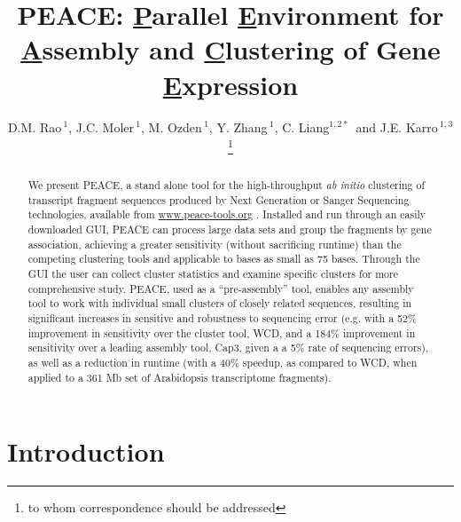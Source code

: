 \documentclass[a4,center,fleqn]{NAR}
\newcommand{\peace} {{\small PEACE}}
\newcommand{\wcd} {{\small WCD}}
\newcommand{\capthree} {{\small Cap3}}
\begin{document}
\title{PEACE: {\underline P}arallel {\underline E}nvironment for {\underline A}ssembly
  and {\underline C}lustering of Gene {\underline E}xpression}

\author{D.M. Rao\,$^{1}$, J.C. Moler\,$^{1}$, M. Ozden\,$^1$, Y. Zhang\,$^{1}$,
  C. Liang$^{1,2*}$\, and J.E. Karro\,$^{1,3}$\footnote{to whom
    correspondence should be addressed}}

\address{$^1$ Department of Computer Science and Software Engineering, \\
  $^2$ Department of Botany, \\
  $^3$ and Department of Microbiology, Miami University, Oxford, Ohio,
  USA}




\maketitle

\begin{abstract}
  We present \peace, a stand alone tool for the high-throughput {\it
    ab initio} clustering of transcript fragment sequences produced by
  Next Generation or Sanger Sequencing technologies, available from
  \href{http://www.peace-tools.org}{www.peace-tools.org} .  Installed
  and run through an easily downloaded GUI, \peace\/ can process large
  data sets and group the fragments by gene association, achieving a
  greater sensitivity (without sacrificing runtime) than the competing
  clustering tools and applicable to bases as small as 75 bases.
  Through the GUI the user can collect cluster statistics and examine
  specific clusters for more comprehensive study.  \peace\/, used as a
  ``pre-assembly'' tool, enables any assembly tool to work with
  individual small clusters of closely related sequences, resulting in
  significant increases in sensitive and robustness to sequencing
  error (e.g. with a 52\% improvement in sensitivity over the cluster
  tool, \wcd\/, and a 184\% improvement in sensitivity over a leading
  assembly tool, \capthree, given a a 5\% rate of sequencing errors),
  as well as a reduction in runtime (with a 40\% speedup, as compared
  to \wcd, when applied to a 361 Mb set of Arabidopsis transcriptome
  fragments).
\end{abstract}


\section{Introduction}
\end{document}
